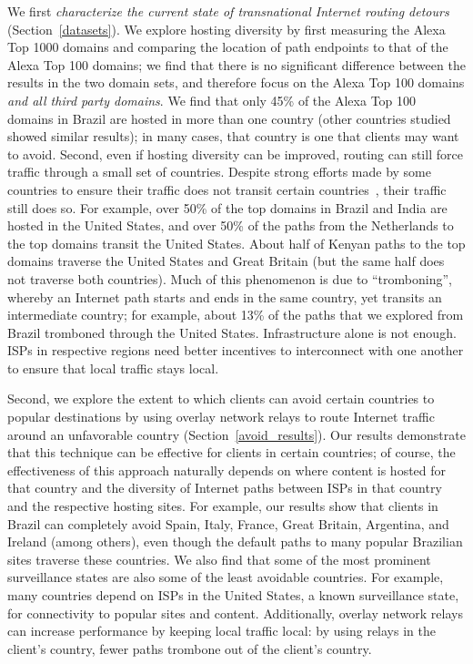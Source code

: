 We first {\em characterize the current state of transnational Internet
routing detours} (Section~\ref{datasets}).  We explore hosting diversity 
by first measuring the Alexa Top 1000 domains and comparing the location of 
path endpoints to that of the Alexa Top 100 domains; we find that there is no 
significant difference between the results in the two domain sets, and therefore 
focus on the Alexa Top 100 domains {\it and all third party domains}.  We find 
that only 45\% of the Alexa Top 100 domains in Brazil are hosted 
in more than one country (other countries studied showed similar results); in many cases,
that country is one that clients may want to avoid. Second, even if
hosting diversity can be improved, routing can still force traffic
through a small set of countries. Despite strong efforts made by some countries to ensure their
traffic does not transit certain countries~\cite{brazil_history,
  brazil_break_from_US, brazil_conference, brazil_conference2,
  brazil_human_rights}, their traffic still does so.  For example, over 50\% of the
top domains in Brazil and India are hosted in the United States, and
over 50\% of the paths from the Netherlands to the top domains transit
the United States.  About half of Kenyan paths to the top domains
traverse the United States and Great Britain (but the same half does not
traverse both countries).  Much of this phenomenon is due to
``tromboning'', whereby an Internet path starts and ends in the same country,
yet transits an intermediate country; for example, about 13\% of the
paths that we explored from Brazil tromboned through the United States.
Infrastructure alone is not enough. ISPs in respective regions
need better incentives to interconnect with one another to ensure
that local traffic stays local.

Second, we {explore the extent to which
clients can avoid certain countries to popular destinations} by using overlay network relays to route 
Internet traffic around an unfavorable country (Section~\ref{avoid_results}).  Our results demonstrate that this technique can
be effective for clients in certain countries; of course, the effectiveness of
this approach naturally depends on where content is hosted for that country
and the diversity of Internet paths between ISPs in that country and the
respective hosting sites. For example, our results show that clients in Brazil
can completely avoid Spain, Italy, France, Great Britain, Argentina, and
Ireland (among others), even though the default paths to many popular
Brazilian sites traverse these countries. We also find that some of the most
prominent surveillance states are also some of the least avoidable countries.
For example, many countries depend on ISPs in the United States, a known
surveillance state, for connectivity to popular sites and content.
Additionally, overlay network relays can increase performance by keeping local
traffic local: by using relays in the client's country, fewer paths trombone
out of the client's country.

